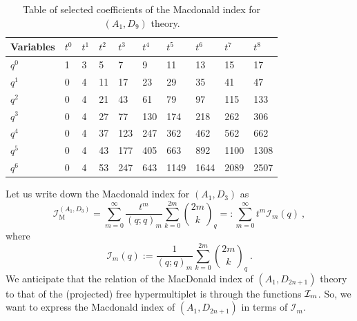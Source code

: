 \documentclass[a4paper,10pt]{article}
\def\CI {{\cal I}}
\def\CI {{{\cal I}}}
\begin{document}
\begin{table}[]
    \centering
    \begin{tabular}{|l|lllllllll|}
\hline Variables & $t^0$ & $t^1$ & $t^2$ & $t^3$ & $t^4$ & $t^5$ & $t^6$ & $t^7$ & $t^8$ \\
\hline $q^0$ & 1 & 3 & 5 & 7 & 9 & 11 & 13 & 15 & 17 \\
$q^1$ & 0 & 4 & 11 & 17 & 23 & 29 & 35 & 41 & 47 \\
$q^2$ & 0 & 4 & 21 & 43 & 61 & 79 & 97 & 115 & 133 \\
$q^3$ & 0 & 4 & 27 & 77 & 130 & 174 & 218 & 262 & 306 \\
$q^4$ & 0 & 4 & 37 & 123 & 247 & 362 & 462 & 562 & 662 \\
$q^5$ & 0 & 4 & 43 & 177 & 405 & 663 & 892 & 1100 & 1308 \\
$q^6$ & 0 & 4 & 53 & 247 & 643 & 1149 & 1644 & 2089 & 2507 \\
\hline
\end{tabular}
    \caption{Table of selected coefficients of the Macdonald index for $(A_1,D_9)$ theory.}
    \label{tab:coeff_mac_A1D9}
\end{table}
Let us write down the Macdonald index for $(A_1, D_3)$ as 
\begin{equation}
\mathcal{I}_{\mathrm{M}}^{\left(A_1, D_3\right)}=\sum_{m=0}^{\infty} \frac{t^m}{(q ; q)_m} \sum_{k=0}^{2 m}\binom{2 m}{k}_q =: \sum_{m=0}^\infty t^m \mathcal{I}_m(q)~,
\end{equation}
where 
\begin{equation}
\mathcal{I}_m(q):= \frac{1}{(q ; q)_m} \sum_{k=0}^{2 m}\binom{2 m}{k}_q~.   
\end{equation}
We anticipate that the relation of the MacDonald index of $(A_1,D_{2n+1})$ theory to that of the (projected) free hypermultiplet is through the functions $\CI_m$. So, we want to express the Macdonald index of $(A_1, D_{2n+1})$ in terms of $\mathcal{I}_m$.
\end{document}
